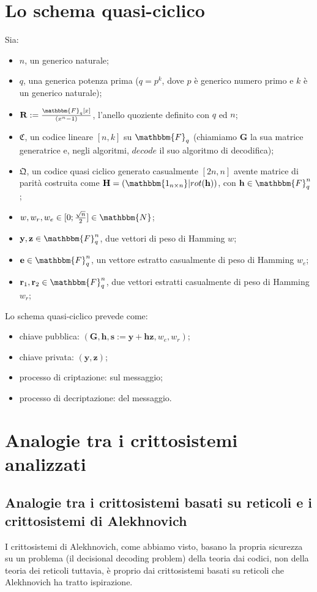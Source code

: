 \documentclass[12pt, a4paper]{report}
\theoremstyle{definition}
\begin{document}
	\chapter{Lo schema quasi-ciclico \cite{8}}
		Sia:
		\begin{itemize}
			\item $n$, un generico naturale;
			\item $q$, una generica potenza prima ($q=p^k$, dove $p$ è generico numero primo e $k$ è un generico naturale);
			\item $\mathbf{R}:=\frac{\mathbbm{F}_q[x]}{(x^n -1)}$, l'anello quoziente definito con $q$ ed $n$;
			\item $\mathfrak{C}$, un codice lineare $[n,k]$ su $\mathbbm{F}_q$ (chiamiamo $\mathbf{G}$ la sua matrice generatrice e, negli algoritmi, $decode$ il suo algoritmo di decodifica);
			\item $\mathfrak{Q}$, un codice quasi ciclico generato casualmente $[2n,n]$ avente matrice di parità costruita come $\mathbf{H}=(\mathbbm{1_{n\times n}}|rot(\textbf{h}))$, con $\textbf{h}\in\mathbbm{F}_q^n$;
			\item $w,w_r,w_e\in[0;\frac{\sqrt{n}}{2}]\in\mathbbm{N}$;
			\item $\textbf{y},\textbf{z}\in\mathbbm{F}_q^n$, due vettori di peso di Hamming $w$;	
			\item $\textbf{e}\in\mathbbm{F}_q^n$, un vettore estratto casualmente di peso di Hamming $w_e$;
			\item $\textbf{r}_1,\textbf{r}_2\in\mathbbm{F}_q^n$, due vettori estratti casualmente di peso di Hamming $w_r$;	
		\end{itemize}
		Lo schema quasi-ciclico prevede come:
		\begin{itemize}
			\item chiave pubblica: $(\mathbf{G},\textbf{h},\textbf{s}:=\textbf{y}+\textbf{hz},w_e,w_r)$;
			\item chiave privata: $(\textbf{y},\textbf{z})$;
			\item processo di criptazione: sul messaggio;
			\item processo di decriptazione: del messaggio.
		\end{itemize}
		\algSeven
		\algEight
	
	\chapter{Analogie tra i crittosistemi analizzati}
		\section{Analogie tra i crittosistemi basati su reticoli e i crittosistemi di Alekhnovich \cite{15}}
		I crittosistemi di Alekhnovich, come abbiamo visto, basano la propria sicurezza su un problema (il decisional decoding problem) della teoria dai codici, non della teoria dei reticoli tuttavia, è proprio dai crittosistemi basati su reticoli che Alekhnovich ha tratto ispirazione.
		
\end{document}
